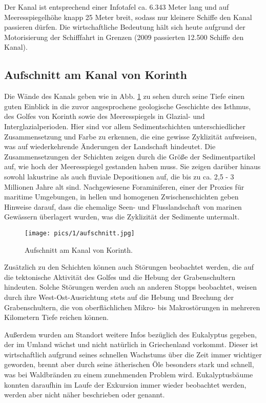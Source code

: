 \documentclass[preprint]{geomorphica} %
\begin{document}
Der Kanal ist entsprechend einer Infotafel ca. 6.343 Meter lang und auf Meeresspiegelhöhe knapp 25 Meter breit, sodass nur kleinere Schiffe den Kanal passieren dürfen. Die wirtschaftliche Bedeutung hält sich heute aufgrund der Motorisierung der Schifffahrt in Grenzen (2009 passierten 12.500 Schiffe den Kanal).

\subsection{Aufschnitt am Kanal von Korinth}

Die Wände des Kanals geben wie in Abb. \ref{pic:aufschnitt} zu sehen durch seine Tiefe einen guten Einblick in die zuvor angesprochene geologische Geschichte des Isthmus, des Golfes von Korinth sowie des Meeresspiegels in Glazial- und Interglazialperioden. Hier sind vor allem Sedimentschichten unterschiedlicher Zusammensetzung und Farbe zu erkennen, die eine gewisse Zyklizität aufweisen, was auf wiederkehrende Änderungen der Landschaft hindeutet. Die Zusammensetzungen der Schichten zeigen durch die Größe der Sedimentpartikel auf, wie hoch der Meeresspiegel gestanden haben muss. Sie zeigen darüber hinaus sowohl lakustrine als auch fluviale Depositionen auf, die bis zu ca. 2,5 - 3 Millionen Jahre alt sind. Nachgewiesene Foraminiferen, einer der Proxies für maritime Umgebungen, in hellen und homogenen Zwischenschichten geben Hinweise darauf, dass die ehemalige Seen- und Flusslandschaft von marinen Gewässern überlagert wurden, was die Zyklizität der Sedimente untermalt.

\begin{figure}[h]
    \centering
    \texttt{[image: pics/1/aufschnitt.jpg]}
    \caption{Aufschnitt am Kanal von Korinth.}
    \label{pic:aufschnitt}
\end{figure}

Zusätzlich zu den Schichten können auch Störungen beobachtet werden, die auf die tektonische Aktivität des Golfes und die Hebung der Grabenschultern hindeuten. Solche Störungen werden auch an anderen Stopps beobachtet, weisen durch ihre West-Ost-Ausrichtung stets auf die Hebung und Brechung der Grabenschultern, die von oberflächlichen Mikro- bis Makrostörungen in mehreren Kilometern Tiefe reichen können.

Außerdem wurden am Standort weitere Infos bezüglich des Eukalyptus gegeben, der im Umland wächst und nicht natürlich in Griechenland vorkommt. Dieser ist wirtschaftlich aufgrund seines schnellen Wachstums über die Zeit immer wichtiger geworden, brennt aber durch seine ätherischen Öle besonders stark und schnell, was bei Waldbränden zu einem zunehmenden Problem wird. Eukalyptusbäume konnten daraufhin im Laufe der Exkursion immer wieder beobachtet werden, werden aber nicht näher beschrieben oder genannt.
\end{document}
